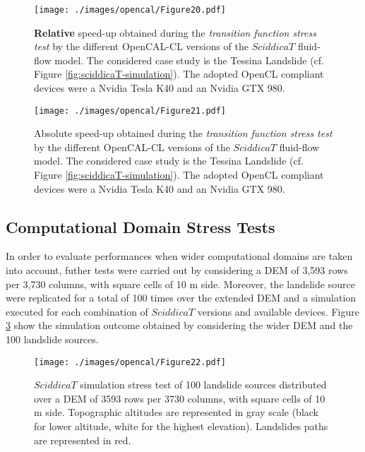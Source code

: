 \begin{figure}
	\begin{center}
		\texttt{[image: ./images/opencal/Figure20.pdf]}
		\caption[\textbf{Relative} speed-up obtained during the \emph{transition function stress test} by different OpenCAL-CL versions of the $SciddicaT$ fluid-flow model.]{\textbf{Relative} speed-up obtained during the \emph{transition function stress
				test} by the different OpenCAL-CL versions of the $SciddicaT$
			fluid-flow model. The considered case study is the Tessina Landslide
			(cf. Figure \ref{fig:sciddicaT-simulation}). The adopted OpenCL
			compliant devices were a Nvidia Tesla K40 and an Nvidia GTX 980.}
		\label{gr:sciddicaT-CL-relative-speed-up-stress}
	\end{center}
\end{figure}

\begin{figure}
	\begin{center}
		\texttt{[image: ./images/opencal/Figure21.pdf]}
		\caption[\textbf{Absolute} speed-up obtained during the \emph{transition function stress test} by different OpenCAL-CL versions of the $SciddicaT$ fluid-flow model.]{Absolute speed-up obtained during the \emph{transition function stress
				test} by the different OpenCAL-CL versions of the $SciddicaT$
			fluid-flow model. The considered case study is the Tessina Landslide
			(cf. Figure \ref{fig:sciddicaT-simulation}). The adopted OpenCL
			compliant devices were a Nvidia Tesla K40 and an Nvidia GTX 980.}
		\label{gr:sciddicaT-CL-absolute-speed-up-stress}
	\end{center}
\end{figure}
\subsection{Computational Domain Stress Tests}
\label{sec:opencal_stress_testR}
In order to evaluate performances when wider computational domains
are taken into account, futher tests were carried out by
considering a DEM of 3,593 rows per 3,730 columns, with square
cells of 10 m side. Moreover, the landslide source were replicated
for a total of 100 times over the extended DEM and a simulation
executed for each combination of $SciddicaT$ versions and
available devices. Figure \ref{fig:stresstestR} show the
simulation outcome obtained by considering the wider DEM and the
100 landslide sources.

\begin{figure}
	\begin{center}
		\texttt{[image: ./images/opencal/Figure22.pdf]}
		\caption[$SciddicaT$ simulation stress test of 100 landslide sources]{$SciddicaT$ simulation stress test of 100 landslide sources
			distributed over a DEM of 3593 rows per 3730 columns, with square
			cells of 10 m side. Topographic altitudes are represented in gray
			scale (black for lower altitude, white for the highest
			elevation). Landslides paths are represented in red.}
		\label{fig:stresstestR}
	\end{center}
\end{figure}

